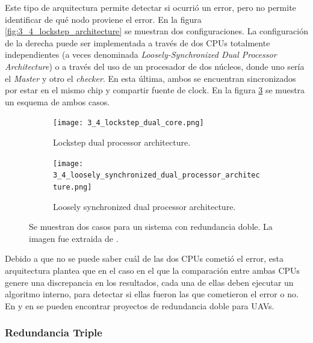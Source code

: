 Este tipo de arquitectura permite detectar si ocurrió un error, pero no permite identificar de qué nodo proviene el error. En la figura \ref{fig:3_4_lockstep_architecture} se muestran dos configuraciones. La configuración de la derecha puede ser implementada a través de dos CPUs totalmente independientes (a veces denominada \textit{Loosely-Synchronized Dual Processor Architecture}) o a través del uso de un procesador de dos núcleos, donde uno sería el \textit{Master} y otro el \textit{checker}\cite{baleani2003fault}. En esta última, ambos se encuentran sincronizados por estar en el mismo chip y compartir fuente de clock. En la figura \ref{fig:3_4_lockstep_architecture_2} se muestra un esquema de ambos casos.

\begin{figure}[H]
    \centering
    \begin{subfigure}[b]{0.49\textwidth}
        \texttt{[image: 3\_4\_lockstep\_dual\_core.png]}
        \caption{Lockstep dual processor architecture.}
        \label{fig:3_4_lockstep_dual_core}
    \end{subfigure}
    \begin{subfigure}[b]{0.49\textwidth}
        \texttt{[image: 3\_4\_loosely\_synchronized\_dual\_processor\_architecture.png]}
        \caption{Loosely synchronized dual processor architecture.}
        \label{fig:3_4_loosely_synchronized_dual_processor_architecture}
    \end{subfigure}
    \caption{Se muestran dos casos para un sistema con redundancia doble. La imagen fue extraida de \cite{baleani2003fault}.}
    \label{fig:3_4_lockstep_architecture_2}
\end{figure}

Debido a que no se puede saber cuál de las dos CPUs cometió el error, esta arquitectura plantea que en el caso en el que la comparación entre ambas CPUs genere una discrepancia en los resultados, cada una de ellas deben ejecutar un algoritmo interno, para detectar si ellas fueron las que cometieron el error o no. En \cite{zhang2015dual} y en \cite{SolanoPerez2019} se pueden encontrar proyectos de redundancia doble para UAVs.

\subsubsection*{Redundancia Triple}

